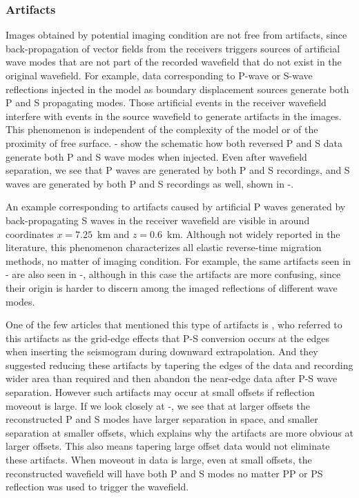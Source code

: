 

\subsubsection{Artifacts}
Images obtained by potential imaging condition are not free from artifacts, since back-propagation of vector fields from the receivers triggers sources of artificial wave modes that are not part of the recorded wavefield that do not exist in the original  wavefield. 
For example, data corresponding to P-wave or S-wave reflections injected in the model as boundary displacement sources generate both P and S propagating modes. Those artificial events in the receiver wavefield interfere with events in the source wavefield  to generate artifacts in the images. This phenomenon is independent of the complexity of the model or of the proximity of free surface. - show the schematic how both reversed P and S data generate both P and S wave modes when injected. Even after wavefield separation, we see that P waves are generated by both P and S recordings, and S waves are generated by both P and S recordings as well, shown in -.

An example corresponding to artifacts caused by artificial P waves generated by back-propagating S waves in the receiver wavefield are visible in  around coordinates $x=7.25$~km and $z=0.6$~km. Although not widely reported in the literature, this phenomenon characterizes all elastic reverse-time migration methods, no matter of imaging condition. For example, the same artifacts seen in - are also seen in  -, although in this case the artifacts are more confusing, since their origin is harder to discern among the imaged reflections of different wave modes.

One of the few articles that mentioned this type of artifacts is \cite{sun:286}, who referred to this artifacts as the grid-edge effects that P-S conversion occurs at the edges when inserting the seismogram during downward extrapolation. And they suggested reducing these artifacts by tapering the edges of the data and recording wider area than required and then abandon the near-edge data after P-S wave separation. However such artifacts may occur at small offsets if reflection moveout is large. If we look closely at -, we see that at larger offsets the reconstructed P and S modes have larger separation in space, and smaller separation at smaller offsets, which explains why the artifacts are more obvious at larger offsets. This also means tapering large offset data would not eliminate these artifacts. When moveout in data is large, even at small offsets, the reconstructed wavefield will have both P and S modes no matter PP or PS reflection was used to trigger the wavefield.

